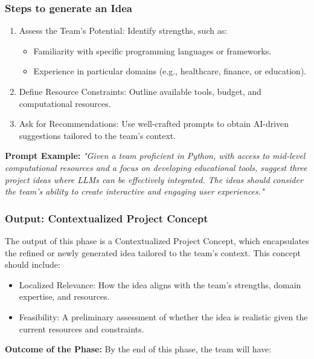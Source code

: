 \documentclass[14pt, a4paper]{article}
\begin{document}
\subsubsection*{Steps to generate an Idea}

\begin{enumerate}
    \item Assess the Team’s Potential: Identify strengths, such as:
    \begin{itemize}
        \item Familiarity with specific programming languages or frameworks.
        \item Experience in particular domains (e.g., healthcare, finance, or
        education).
    \end{itemize}
    \item Define Resource Constraints: Outline available tools, budget, and
    computational resources.
    \item Ask for Recommendations: Use well-crafted prompts to obtain AI-driven
    suggestions tailored to the team's context.
\end{enumerate}

\textbf{Prompt Example:} \textit{"Given a team proficient in Python, with access
to mid-level computational resources and a focus on developing educational
tools, suggest three project ideas where LLMs can be effectively integrated. The
ideas should consider the team's ability to create interactive and engaging user
experiences."}

\subsubsection{Output: Contextualized Project Concept}

The output of this phase is a Contextualized Project Concept, which encapsulates
the refined or newly generated idea tailored to the team’s context. This concept
should include:

\begin{itemize}
    \item Localized Relevance: How the idea aligns with the team's strengths,
    domain expertise, and resources.
    \item Feasibility: A preliminary assessment of whether the idea is realistic
    given the current resources and constraints.
\end{itemize}

\textbf{Outcome of the Phase:} By the end of this phase, the team will have:
\end{document}
